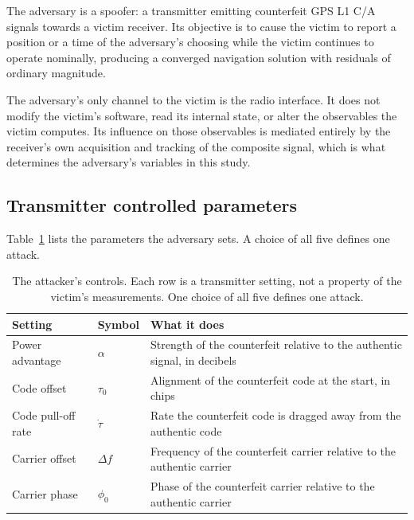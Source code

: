 \documentclass[pdflatex,sn-basic]{sn-jnl}
\theoremstyle{thmstyleone}
\theoremstyle{thmstyletwo}
\theoremstyle{thmstylethree}
\begin{document}
The adversary is a spoofer: a transmitter emitting counterfeit GPS L1 C/A signals towards
a victim receiver. Its objective is to cause the victim to report a position or a time of
the adversary's choosing while the victim continues to operate nominally, producing a
converged navigation solution with residuals of ordinary magnitude.

The adversary's only channel to the victim is the radio interface. It does not modify the
victim's software, read its internal state, or alter the observables the victim computes.
Its influence on those observables is mediated entirely by the receiver's own acquisition
and tracking of the composite signal, which is what determines the adversary's variables
in this study.

\subsection{Transmitter controlled parameters}

Table~\ref{tab:attacker} lists the parameters the adversary sets. A choice of all five
defines one attack.

\begin{table}[t]
\centering
\caption{The attacker's controls. Each row is a transmitter setting, not a property of
the victim's measurements. One choice of all five defines one attack.}
\label{tab:attacker}
\begin{tabular}{@{}llp{8.5cm}@{}}
\toprule
Setting & Symbol & What it does \\
\midrule
Power advantage      & $\alpha$   & Strength of the counterfeit relative to the
                                    authentic signal, in decibels \\
Code offset          & $\tau_0$   & Alignment of the counterfeit code at the start,
                                    in chips \\
Code pull-off rate   & $\dot\tau$ & Rate the counterfeit code is dragged away from the
                                    authentic code \\
Carrier offset       & $\Delta f$ & Frequency of the counterfeit carrier relative to
                                    the authentic carrier \\
Carrier phase        & $\phi_0$   & Phase of the counterfeit carrier relative to the
                                    authentic carrier \\
\bottomrule
\end{tabular}
\end{table}
\end{document}
